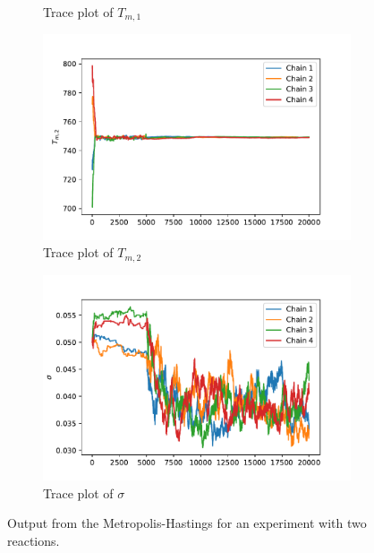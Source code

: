 \begin{figure}[h!]
\begin{subfigure}{0.5\textwidth}
\caption{Trace plot of $T_{m,1}$}
\label{traceTm1}
\end{subfigure}%
\begin{subfigure}{0.5\textwidth}
\centering
\includegraphics[width=\linewidth]{figures/bayesian/2_reactions/mass/trace_plot_Tm2.pdf}
\caption{Trace plot of $T_{m,2}$}
\label{HistTm2}
\end{subfigure}%
\newline
\begin{subfigure}{0.5\textwidth}
\centering
\includegraphics[width=\linewidth]{figures/bayesian/2_reactions/mass/trace_plot_sigma.pdf}
\caption{Trace plot of $\sigma$}
\label{tracesigma2}
\end{subfigure}%
\caption{Output from the Metropolis-Hastings for an experiment with two reactions.}
\label{fig:MH4}
\end{figure}